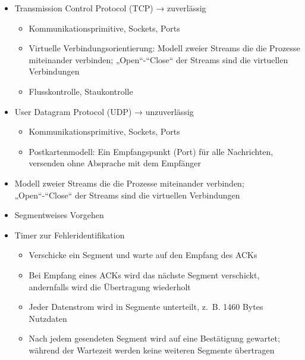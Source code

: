 
\begin{itemize}
    \item Transmission Control Protocol (TCP) → zuverlässig
    \begin{itemize}
        \item Kommunikationsprimitive, Sockets, Ports
        \item Virtuelle Verbindungsorientierung: Modell zweier Streams die die Prozesse miteinander verbinden;
        „Open“-“Close“ der Streams sind die virtuellen Verbindungen
        \item Flusskontrolle, Staukontrolle
    \end{itemize}
    \item User Datagram Protocol (UDP) → unzuverlässig
    \begin{itemize}
        \item Kommunikationsprimitive, Sockets, Ports
        \item Postkartenmodell: Ein Empfangspunkt (Port) für alle Nachrichten, versenden ohne Absprache mit dem Empfänger
    \end{itemize}
\end{itemize}

\begin{itemize}
    \item Modell zweier Streams die die Prozesse miteinander verbinden;
    „Open“-“Close“ der Streams sind die virtuellen Verbindungen
\end{itemize}

\begin{itemize}
    \item Segmentweises Vorgehen
    \item Timer zur Fehleridentifikation
    \begin{itemize}
        \item Verschicke ein Segment und warte auf den Empfang des ACKs
        \item Bei Empfang eines ACKs wird das nächste Segment verschickt, andernfalls wird die Übertragung wiederholt
        \item Jeder Datenstrom wird in Segmente unterteilt, z.\ B. 1460 Bytes Nutzdaten
        \item Nach jedem gesendeten Segment wird auf eine Bestätigung gewartet;
        während der Wartezeit werden keine weiteren Segmente übertragen
    \end{itemize}
\end{itemize}

